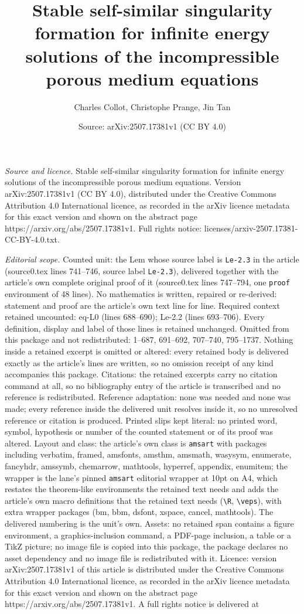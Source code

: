\documentclass[10pt,a4paper]{amsart}
\title[Stable self-similar singularity formation for infinite energ]{Stable self-similar singularity formation for infinite energy solutions of the incompressible porous medium equations}
\author{Charles Collot, Christophe Prange, Jin Tan}
\date{Source: arXiv:2507.17381v1 (CC BY 4.0)}
\begin{document}
\maketitle

\noindent\emph{Source and licence.} Stable self-similar singularity formation for infinite energy solutions of the incompressible porous medium equations. Version arXiv:2507.17381v1 (CC BY 4.0), distributed under the Creative Commons Attribution 4.0 International licence, as recorded in the arXiv licence metadata for this exact version and shown on the abstract page https://arxiv.org/abs/2507.17381v1. Full rights notice: licenses/arxiv-2507.17381-CC-BY-4.0.txt.\par\smallskip

\noindent\textit{Editorial scope.} Counted unit: the Lem whose source label is \texttt{Le-2.3} in the article (source0.tex lines 741--746, source label \texttt{Le-2.3}), delivered together with the article's own complete original proof of it (source0.tex lines 747--794, one \texttt{proof} environment of 48 lines). No mathematics is written, repaired or re-derived: statement and proof are the article's own text line for line. Required context retained uncounted: eq-L0 (lines 688--690); Le-2.2 (lines 693--706). Every definition, display and label of those lines is retained unchanged. Omitted from this package and not redistributed: 1--687, 691--692, 707--740, 795--1737. Nothing inside a retained excerpt is omitted or altered: every retained body is delivered exactly as the article's lines are written, so no omission receipt of any kind accompanies this package. Citations: the retained excerpts carry no citation command at all, so no bibliography entry of the article is transcribed and no reference is redistributed. Reference adaptation: none was needed and none was made; every reference inside the delivered unit resolves inside it, so no unresolved reference or citation is produced. Printed slips kept literal: no printed word, symbol, hypothesis or number of the counted statement or of its proof was altered. Layout and class: the article's own class is \texttt{amsart} with packages including verbatim, framed, amsfonts, amsthm, amsmath, wasysym, enumerate, fancyhdr, amssymb, chemarrow, mathtools, hyperref, appendix, enumitem; the wrapper is the lane's pinned \texttt{amsart} editorial wrapper at 10pt on A4, which restates the theorem-like environments the retained text needs and adds the article's own macro definitions that the retained text needs (\texttt{\textbackslash R}, \texttt{\textbackslash veps}), with extra wrapper packages (bm, bbm, dsfont, xspace, cancel, mathtools). The delivered numbering is the unit's own. Assets: no retained span contains a figure environment, a graphics-inclusion command, a PDF-page inclusion, a table or a TikZ picture; no image file is copied into this package, the package declares no asset dependency and no image file is redistributed with it. Licence: version arXiv:2507.17381v1 of this article is distributed under the Creative Commons Attribution 4.0 International licence, as recorded in the arXiv licence metadata for this exact version and shown on the abstract page https://arxiv.org/abs/2507.17381v1. A full rights notice is delivered at 
\end{document}
